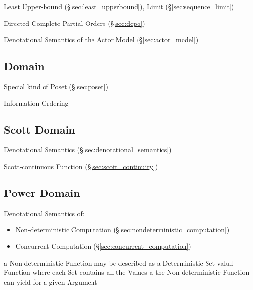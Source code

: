 Least Upper-bound (\S\ref{sec:least_upperbound}), Limit
(\S\ref{sec:sequence_limit})

Directed Complete Partial Orders (\S\ref{sec:dcpo})

Denotational Semantics of the Actor Model (\S\ref{sec:actor_model})



\subsection{Domain}\label{sec:order_domain}

Special kind of Poset (\S\ref{sec:poset})

Information Ordering



\subsection{Scott Domain}\label{sec:scott_domain}

Denotational Semantics (\S\ref{sec:denotational_semantics})

Scott-continuous Function (\S\ref{sec:scott_continuity})



\subsection{Power Domain}\label{sec:power_domain}

Denotational Semantics of:
\begin{itemize}
  \item Non-deterministic Computation
    (\S\ref{sec:nondeterministic_computation})
  \item Concurrent Computation (\S\ref{sec:concurrent_computation})
\end{itemize}

a Non-deterministic Function may be described as a Deterministic
Set-valud Function where each Set contains all the Values a the
Non-deterministic Function can yield for a given Argument

